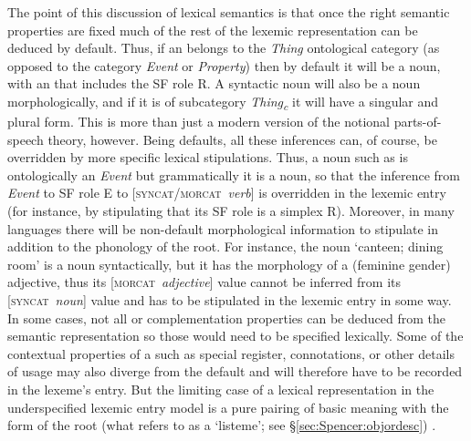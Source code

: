 \documentclass[output=paper]{langsci/langscibook}
\begin{document}
The point of this discussion of lexical semantics is that once the right semantic properties are fixed much of the rest of the lexemic representation can be deduced by default. Thus, if an   belongs to the \textit{Thing} ontological category (as opposed to the category \textit{Event} or \textit{Property}) then by default it will be a noun, with an  that includes the SF role R.  A syntactic noun  will also be a noun morphologically, and if it is of subcategory \textit{Thing\textsubscript{c}} it will have  a singular and plural form. This is more than just a modern version of the notional parts-of-speech theory, however.  Being defaults, all these inferences can, of course, be overridden by more specific lexical stipulations.  Thus, a noun such as  is ontologically an \textit{Event} but grammatically it is a noun, so that the inference from \textit{Event} to SF role E to [\textsc{syncat}/\textsc{morcat}~\textit{verb}] is overridden in the lexemic entry (for instance, by stipulating that its SF role is a simplex R). %
 Moreover, in many languages there will be non-default morphological information to stipulate in addition to the phonology of the root. For instance,  the  noun  `canteen; dining room' is a noun syntactically, but it has the morphology of a (feminine gender) adjective, thus its [\textsc{morcat}~\textit{adjective}] value cannot be inferred from its [\textsc{syncat}~\textit{noun}] value and has to be stipulated in the lexemic entry in some way.
 In some cases, not all   or complementation properties can be deduced from the semantic representation so those would need to be specified lexically. Some of the contextual properties of a  such as special register, connotations, or other details of usage may also diverge from the default and will therefore have to be recorded in the lexeme's entry.
But the limiting case of a lexical representation in the underspecified lexemic entry model is a pure pairing of basic meaning with the form of the root %
(what %
\citealt{Sag12} %
%
refers to as a `listeme'; see \S\ref{sec:Spencer:objordesc})
%
.
\end{document}
